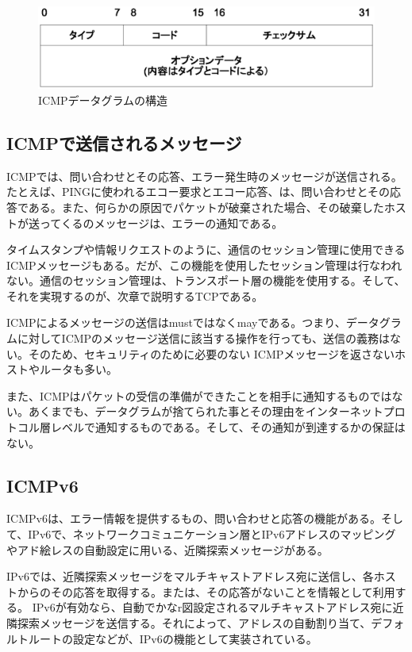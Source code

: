 \begin{figure}[htbp]
	\includegraphics[width=12cm,clip]{draw/icmpheader.eps}
	\caption{ICMPデータグラムの構造}
	\label{fig:icmpheader}
\end{figure}


\subsection{ICMPで送信されるメッセージ}

ICMPでは、問い合わせとその応答、エラー発生時のメッセージが送信される。たとえば、PINGに使われるエコー要求とエコー応答、は、問い合わせとその応答である。また、何らかの原因でパケットが破棄された場合、その破棄したホストが送ってくるのメッセージは、エラーの通知である。

タイムスタンプや情報リクエストのように、通信のセッション管理に使用できるICMPメッセージもある。だが、この機能を使用したセッション管理は行なわれない。通信のセッション管理は、トランスポート層の機能を使用する。そして、それを実現するのが、次章で説明するTCPである。

ICMPによるメッセージの送信はmustではなくmayである。つまり、データグラムに対してICMPのメッセージ送信に該当する操作を行っても、送信の義務はない。そのため、セキュリティのために必要のない ICMPメッセージを返さないホストやルータも多い。

また、ICMPはパケットの受信の準備ができたことを相手に通知するものではない。あくまでも、データグラムが捨てられた事とその理由をインターネットプロトコル層レベルで通知するものである。そして、その通知が到達するかの保証はない。

\subsection{ICMPv6}
ICMPv6は、エラー情報を提供するもの、問い合わせと応答の機能がある。そして、IPv6で、ネットワークコミュニケーション層とIPv6アドレスのマッピングやアド絵レスの自動設定に用いる、近隣探索メッセージがある。

IPv6では、近隣探索メッセージをマルチキャストアドレス宛に送信し、各ホストからのその応答を取得する。または、その応答がないことを情報として利用する。
IPv6が有効なら、自動でかなr図設定されるマルチキャストアドレス宛に近隣探索メッセージを送信する。それによって、アドレスの自動割り当て、デフォルトルートの設定などが、IPv6の機能として実装されている。

